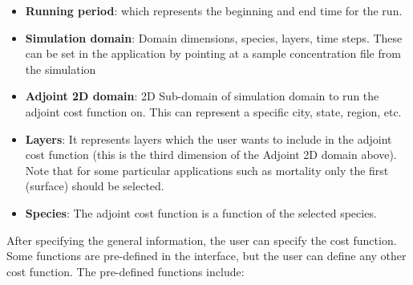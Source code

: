 \documentclass{article}
\begin{document}
\begin{itemize}
	\item \textbf{Running period}: which represents the beginning and end time for the run.
	\item \textbf{Simulation domain}: Domain dimensions, species, layers, time steps. These can be set in the application by pointing at a sample concentration file from the simulation
	\item \textbf{Adjoint 2D domain}: 2D Sub-domain of simulation domain to run the adjoint cost function on. This can represent a specific city, state, region, etc.
	\item \textbf{Layers}: It represents layers which the user wants to include in the adjoint cost function (this is the third dimension of the Adjoint 2D domain above). Note that for some particular applications such as mortality only the first (surface) should be selected.
	\item \textbf{Species}: The adjoint cost function is a function of the selected species.
\end{itemize}

After specifying the general information, the user can specify the cost function. Some functions are pre-defined in the interface, but the user can define any other cost function. The pre-defined functions include:
\end{document}
